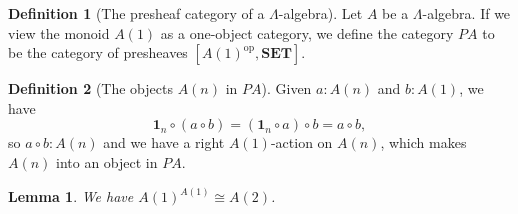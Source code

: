 \documentclass[a4paper]{amsbook}
\newtheorem{lemma}{Lemma}
\theoremstyle{definition}
\newtheorem{definition}{Definition}
\theoremstyle{remark}
\newcommand{\op}[1]{\ensuremath{#1^{\text{op}}}}
\newcommand\SET{\mathbf{SET}}
\begin{document}
  \begin{definition}[The presheaf category of a $ \Lambda $-algebra]
    Let $ A $ be a $ \Lambda $-algebra. If we view the monoid $ A(1) $ as a one-object category, we define the category $ PA $ to be the category of presheaves $ [\op{A(1)}, \SET] $.
  \end{definition}

  \begin{definition}[The objects $ A(n) $ in $ PA $]
    Given $ a: A(n) $ and $ b: A(1) $, we have
    \[ \mathbf 1_n \circ (a \circ b) = (\mathbf 1_n \circ a) \circ b = a \circ b, \]
    so $ a \circ b: A(n) $ and we have a right $ A(1) $-action on $ A(n) $, which makes $ A(n) $ into an object in $ PA $.
  \end{definition}

  \begin{lemma}
    We have $ A(1)^{A(1)} \cong A(2) $.
  \end{lemma}
\end{document}

